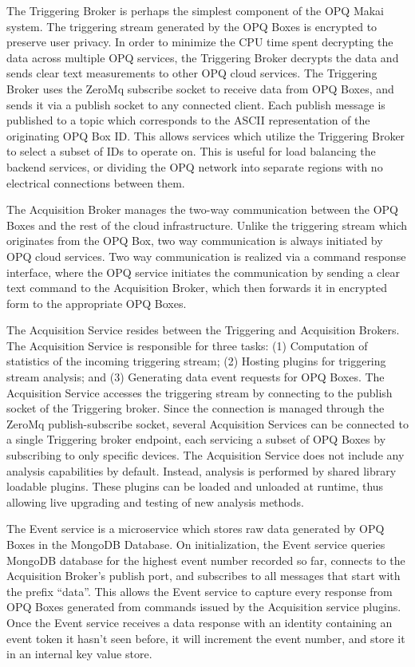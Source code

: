 The Triggering Broker is perhaps the simplest component of the OPQ Makai system. The triggering stream generated by the OPQ Boxes is encrypted to preserve user privacy. In order to minimize the CPU time spent decrypting the data across multiple OPQ services, the Triggering Broker decrypts the data and sends clear text measurements to other OPQ cloud services. The Triggering Broker uses the ZeroMq subscribe socket to receive data from OPQ Boxes, and sends it via a publish socket to any connected client. Each publish message is published to a topic which corresponds to the ASCII representation of the originating OPQ Box ID. This allows services which utilize the Triggering Broker to select a subset of IDs to operate on. This is useful for load balancing the backend services, or dividing the OPQ network into separate regions with no electrical connections between them.

The Acquisition Broker manages the two-way communication between the OPQ Boxes and the rest of the cloud infrastructure. Unlike the triggering stream which originates from the OPQ Box, two way communication is always initiated by OPQ cloud services. Two way communication is realized via a command response interface, where the OPQ service initiates the communication by sending a clear text command to the Acquisition Broker, which then forwards it in encrypted form to the appropriate OPQ Boxes.

The Acquisition Service resides between the Triggering and Acquisition Brokers. The Acquisition Service is responsible for three tasks:
(1) Computation of statistics of the incoming triggering stream; (2) Hosting plugins for triggering stream analysis; and (3) Generating data event requests for OPQ Boxes. The Acquisition Service accesses the triggering stream by connecting to the publish socket of the Triggering broker. Since the connection is managed through the ZeroMq publish-subscribe socket, several Acquisition Services can be connected to a single Triggering broker endpoint, each servicing a subset of OPQ Boxes by subscribing to only specific devices. The Acquisition Service does not include any analysis capabilities by default. Instead, analysis is performed by shared library loadable plugins. These plugins can be loaded and unloaded at runtime, thus allowing live upgrading and testing of new analysis methods.

The Event service is a microservice which stores raw data generated by OPQ Boxes in the MongoDB Database. On initialization, the Event service queries MongoDB database for the highest event number recorded so far, connects to the Acquisition Broker’s publish port, and subscribes to all messages that start with the prefix “data”. This allows the Event service to capture every response from OPQ Boxes generated from commands issued by the Acquisition service plugins. Once the Event service receives a data response with an identity containing an event token it hasn’t seen before, it will increment the event number, and store it in an internal key value store.



